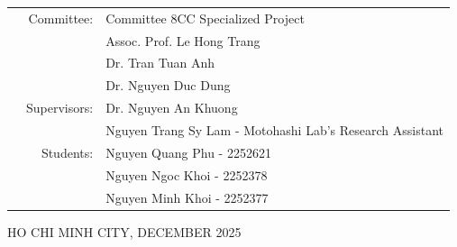 \documentclass[openany]{mitthesis}
\theoremstyle{definition}
\begin{document}
\begin{titlepage}
\begin{table}[h]
\begin{tabular}{rrl}
  
\hspace{4 cm} & Committee: & Committee 8CC Specialized Project \\
& & Assoc. Prof. Le Hong Trang \\
& & Dr. Tran Tuan Anh \\
& & Dr. Nguyen Duc Dung \\
& Supervisors: & Dr. Nguyen An Khuong \\
& & Nguyen Trang Sy Lam - Motohashi Lab's Research Assistant \\
& Students: & Nguyen Quang Phu - 2252621 \\
& & Nguyen Ngoc Khoi - 2252378 \\
& & Nguyen Minh Khoi - 2252377 \\
\end{tabular}
\end{table}

\vspace{0.5cm}

\begin{center}
{\footnotesize HO CHI MINH CITY, DECEMBER 2025}
\end{center}
\restoregeometry
\end{titlepage}

\tableofcontents
\listoffigures
\listoftables

\pgfplotsset{compat=1.18}












\printbibliography[title=References]

\end{document}
